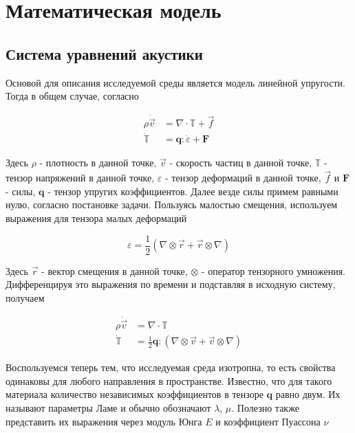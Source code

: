 \section{Математическая модель}
\label{sec:Chapter1} 

\subsection{Система уравнений акустики}
Основой для описания исследуемой среды является модель линейной упругости. Тогда в общем случае, согласно \cite{kondaurov}

\begin{equation}
	\begin{aligned}
		\rho \dot{\vec{v}} & =\nabla \cdot \mathbb{T}+\vec{f} \\
		\dot{\mathbb{T}} & =\mathbf{q}: \dot{\varepsilon}+\mathbf{F}
	\end{aligned}
\end{equation}

Здесь $\rho$ - плотность в данной точке, $\vec{v}$ - скорость частиц в данной точке, $\mathbb{T}$ - тензор напряжений в данной точке, $\varepsilon$ - тензор деформаций в данной точке, $\vec{f}$ и $\mathbf{F}$ - силы, $\mathbf{q}$ - тензор упругих коэффициентов. Далее везде силы примем равными нулю, согласно постановке задачи. Пользуясь малостью смещения, используем выражения для тензора малых деформаций

\begin{equation}
	\varepsilon=\frac{1}{2}\left(\nabla \otimes \vec{r}+\vec{r} \otimes \nabla\right)
\end{equation}

Здесь $\vec{r}$ - вектор смещения в данной точке, $\otimes$ - оператор тензорного умножения. Дифференцируя это выражения по времени и подставляя в исходную систему, получаем

\begin{equation}
	\begin{aligned}
		\rho \dot{\vec{v}} & =\nabla \cdot \mathbb{T} \\
		\dot{\mathbb{T}} & =\frac{1}{2} \mathbf{q}:\left(\nabla \otimes \vec{v}+ \vec{v} \otimes \nabla \right)
	\end{aligned}
\end{equation}

Воспользуемся теперь тем, что исследуемая среда изотропна, то есть свойства одинаковы для любого направления в пространстве. Известно, что для такого материала количество независимых коэффициентов в тензоре $\mathbf{q}$ равно двум. Их называют параметры Ламе и обычно обозначают $\lambda$, $\mu$. Полезно также представить их выражения через модуль Юнга $E$ и коэффициент Пуассона $\nu$

